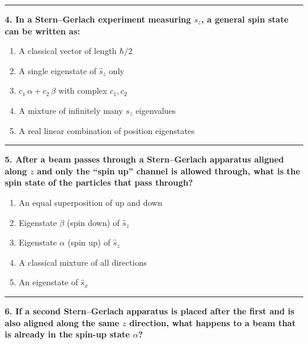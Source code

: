 \documentclass[
  english,
  9pt,
]{extbook}
\providecommand{\tightlist}{%
  \setlength{\itemsep}{0pt}\setlength{\parskip}{0pt}}
\theoremstyle{definition}
\theoremstyle{definition}
\theoremstyle{definition}
\theoremstyle{definition}
\theoremstyle{remark}
\begin{document}
\begin{center}\rule{0.5\linewidth}{0.5pt}\end{center}

\textbf{4. In a Stern--Gerlach experiment measuring \(s_z\), a general spin state can be written as:}

\begin{enumerate}
\def\labelenumi{\alph{enumi}.}
\tightlist
\item
  A classical vector of length \(\hbar/2\)\\
\item
  A single eigenstate of \(\hat{s}_z\) only\\
\item
  \(c_1\,\alpha + c_2\,\beta\) with complex \(c_1, c_2\)\\
\item
  A mixture of infinitely many \(s_z\) eigenvalues\\
\item
  A real linear combination of position eigenstates
\end{enumerate}

\begin{center}\rule{0.5\linewidth}{0.5pt}\end{center}

\textbf{5. After a beam passes through a Stern--Gerlach apparatus aligned along \(z\) and only the ``spin up'' channel is allowed through, what is the spin state of the particles that pass through?}

\begin{enumerate}
\def\labelenumi{\alph{enumi}.}
\tightlist
\item
  An equal superposition of up and down\\
\item
  Eigenstate \(\beta\) (spin down) of \(\hat{s}_z\)\\
\item
  Eigenstate \(\alpha\) (spin up) of \(\hat{s}_z\)\\
\item
  A classical mixture of all directions\\
\item
  An eigenstate of \(\hat{s}_x\)
\end{enumerate}

\begin{center}\rule{0.5\linewidth}{0.5pt}\end{center}

\textbf{6. If a second Stern--Gerlach apparatus is placed after the first and is also aligned along the same \(z\) direction, what happens to a beam that is already in the spin-up state \(\alpha\)?}
\end{document}
